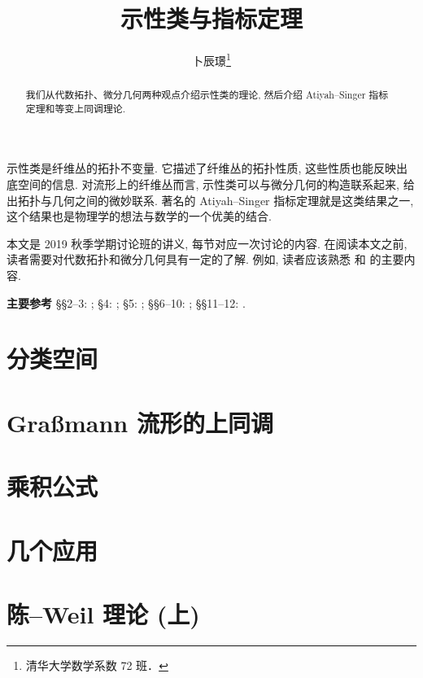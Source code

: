 \documentclass[twoside]{article}
\begin{document}
\title{示性类与指标定理}
\author{卜辰璟\footnote{清华大学数学系数 72 班．}}

\begin{abstract}
    我们从代数拓扑、微分几何两种观点介绍示性类的理论, 
    然后介绍 Atiyah--Singer 指标定理和等变上同调理论.
\end{abstract}

示性类是纤维丛的拓扑不变量. 
它描述了纤维丛的拓扑性质, 这些性质也能反映出底空间的信息.
对流形上的纤维丛而言, 示性类可以与微分几何的构造联系起来, 
给出拓扑与几何之间的微妙联系. 
著名的 Atiyah--Singer 指标定理就是这类结果之一,
这个结果也是物理学的想法与数学的一个优美的结合.

本文是 2019 秋季学期讨论班的讲义, 每节对应一次讨论的内容. 
在阅读本文之前, 读者需要对代数拓扑和微分几何具有一定的了解.
例如, 读者应该熟悉 \cite{may} 和 \cite{do-carmo} 的主要内容.

\tableofcontents

\bigskip
\begin{trivlist}
    \item []
        \textbf{主要参考}\quad
        \S\S2--3: \cite{cohen};
        \S4: \cite{milnor-stasheff};
        \S5: \cite{rahman};
        \S\S6--10: \cite{bgv};
        \S\S11--12: \cite{libine}.
\end{trivlist}

\clearpage

\section{分类空间} \label{sect-1}



\section{Graßmann 流形的上同调} \label{sect-2}



\section{乘积公式} \label{sect-3}



\section{几个应用} \label{sect-4}



\section{陈--Weil 理论 (上)} \label{sect-5}
\end{document}
